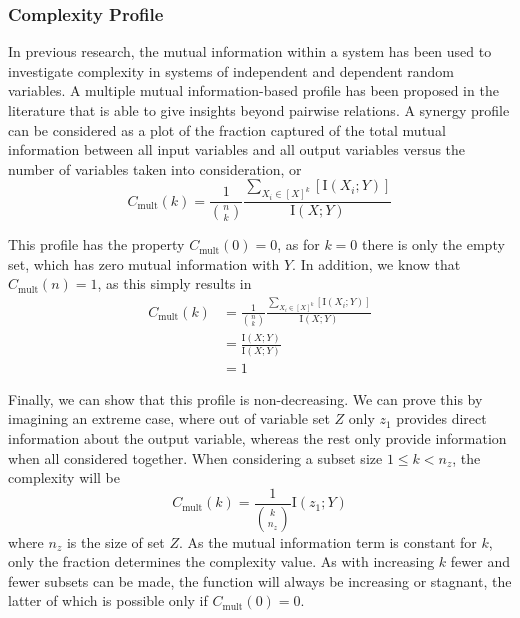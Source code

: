 \documentclass[../main.tex]{subfiles}
\begin{document}
\subsubsection{Complexity Profile}

In previous research, the mutual information within a system has been used to investigate complexity in systems of independent and dependent random variables.
A multiple mutual information-based profile has been proposed in the literature that is able to give insights beyond pairwise relations.
A synergy profile can be considered as a plot of the fraction captured of the total mutual information between all input variables and all output variables versus the number of variables taken into consideration, or
%
\begin{equation}
C_\mathrm{mult}(k) = \frac{1}{\binom{n}{k}}\frac{\sum_{X_i \in [X]^k} [\mathrm{I}(X_i;Y)]}{\mathrm{I}(X;Y)}
\end{equation}

This profile has the property $C_\mathrm{mult}(0) = 0$, as for $k = 0$ there is only the empty set, which has zero mutual information with $Y$.
In addition, we know that $C_\mathrm{mult}(n) = 1$, as this simply results in
%
\begin{align}
C_\mathrm{mult}(k) 
&= \frac{1}{\binom{n}{k}}\frac{\sum_{X_i \in [X]^k} [\mathrm{I}(X_i;Y)]}{\mathrm{I}(X;Y)} \\
&= \frac{\mathrm{I}(X;Y)}{\mathrm{I}(X;Y)} \\
&= 1
\end{align}

Finally, we can show that this profile is non-decreasing.
We can prove this by imagining an extreme case, where out of variable set $Z$ only $z_1$ provides direct information about the output variable, whereas the rest only provide information when all considered together.
When considering a subset size $1 \le k < n_z $, the complexity will be
%
\begin{equation}
C_\mathrm{mult}(k) = \frac{1}{\binom{k}{n_z}} \mathrm{I}(z_1;Y)
\end{equation}
%
where $n_z$ is the size of set $Z$.
As the mutual information term is constant for $k$, only the fraction determines the complexity value.
As with increasing $k$ fewer and fewer subsets can be made, the function will always be increasing or stagnant, the latter of which is possible only if $C_\mathrm{mult}(0) = 0$.
\end{document}
